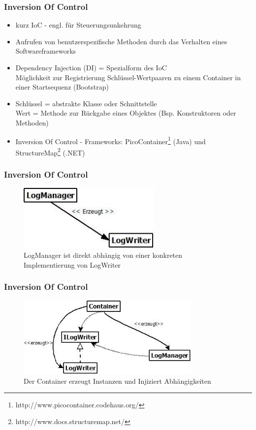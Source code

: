 \documentclass{beamer}
\begin{document}
\begin{frame}
\frametitle{Inversion Of Control}
\begin{itemize}
\item kurz IoC - engl. für Steuerungsunkehrung
\item Aufrufen von benutzerspezifische Methoden durch das Verhalten eines Softwareframeworks
\item Dependency Injection (DI) = Spezialform des IoC\\Möglichkeit zur Registrierung Schlüssel-Wertpaaren zu einem Container in einer Startsequenz (Bootstrap)
\item Schlüssel = abstrakte Klasse oder Schnittstelle\\Wert = Methode zur Rückgabe eines Objektes (Bsp. Konstruktoren oder Methoden)
\item Inversion Of Control - Frameworks:
PicoContainer\footnote{http://www.picocontainer.codehaus.org/} (Java) und StructureMap\footnote{http://www.docs.structuremap.net/} (.NET)
\end{itemize}
\end{frame}

\begin{frame}
\frametitle{Inversion Of Control}
\begin{figure}[htbp]
\includegraphics[width=7cm]{logging_closeCoupled.jpg}
\caption{LogManager ist direkt abhängig von einer konkreten Implementierung von LogWriter}
\end{figure}
\end{frame}

\begin{frame}
\frametitle{Inversion Of Control}
\begin{figure}[htbp]
\includegraphics[width=9cm]{logging_looseCoupled.jpg}
\caption{Der Container erzeugt Instanzen und Injiziert Abhängigkeiten}
\end{figure}
\end{frame}
\end{document}
